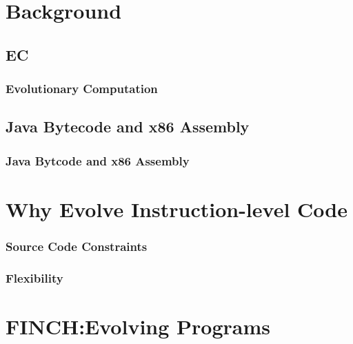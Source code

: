 \documentclass{beamer}
\begin{document}
\section[Background]{Background}

\subsection[EC]{EC}

\begin{frame}
  \frametitle{Evolutionary Computation}

\end{frame}

\subsection[Bytecode and Assembly]{Java Bytecode and x86 Assembly}
\begin{frame}
\frametitle{Java Bytcode and x86 Assembly}
\end{frame}

\section[Why Instruction-level code]{Why Evolve Instruction-level Code}

\begin{frame}
	\frametitle{Source Code Constraints}
\end{frame}

\begin{frame}
	\frametitle{Flexibility}
\end{frame}

\section[FINCH]{FINCH:Evolving Programs}
\end{document}
